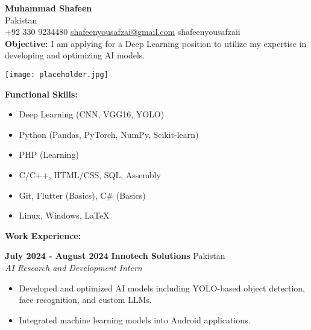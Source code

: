 \documentclass[a4paper,10pt]{article}
\begin{document}
\begin{minipage}[t]{0.68\textwidth}
    {\LARGE \textbf{Muhammad Shafeen}}\\
    Pakistan\\
    +92 330 9234480 \textbar{} \href{mailto:shafeenyousafzai@gmail.com}{shafeenyousafzai@gmail.com} \textbar{} shafeenyousafzaii\\
    \vspace{5pt}
    \textbf{Objective:} I am applying for a Deep Learning position to utilize my expertise in developing and optimizing AI models.
\end{minipage}
\begin{minipage}[t]{0.28\textwidth}
    \begin{flushright}
        \texttt{[image: placeholder.jpg]} %
    \end{flushright}
\end{minipage}

\vspace{10pt}

\textbf{Functional Skills:}
\begin{itemize}
    \item Deep Learning (CNN, VGG16, YOLO)
    \item Python (Pandas, PyTorch, NumPy, Scikit-learn)
    \item PHP (Learning)
    \item C/C++, HTML/CSS, SQL, Assembly
    \item Git, Flutter (Basics), C\# (Basics)
    \item Linux, Windows, LaTeX
\end{itemize}

\vspace{5pt}

\textbf{Work Experience:}

\vspace{5pt}

\textbf{July 2024 - August 2024} \hfill \textbf{Innotech Solutions} \hfill Pakistan\\
\textit{AI Research and Development Intern}
\begin{itemize}
    \item Developed and optimized AI models including YOLO-based object detection, face recognition, and custom LLMs.
    \item Integrated machine learning models into Android applications.
\end{itemize}
\end{document}
